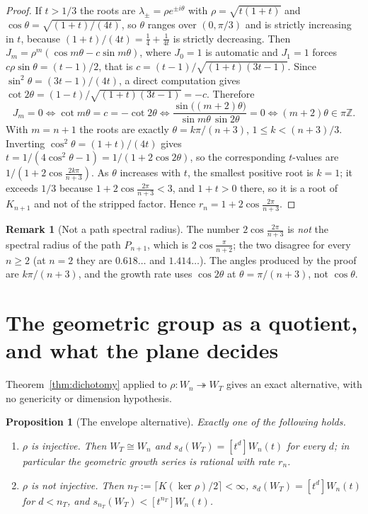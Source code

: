 \documentclass[11pt]{article}
\newcommand{\Z}{\mathbb{Z}}
\newtheorem{proposition}[theorem]{Proposition}
\theoremstyle{definition}
\newtheorem{remark}[theorem]{Remark}
\begin{document}
\begin{proof}
If $t>1/3$ the roots are $\lambda_\pm=\rho e^{\pm i\theta}$ with $\rho=\sqrt{t(1+t)}$ and
$\cos\theta=\sqrt{(1+t)/(4t)}$, so $\theta$ ranges over $(0,\pi/3)$ and is strictly increasing in $t$,
because $(1+t)/(4t)=\tfrac14+\tfrac1{4t}$ is strictly decreasing. Then
$J_m=\rho^m(\cos m\theta-c\sin m\theta)$, where $J_0=1$ is automatic and $J_1=1$ forces
$c\rho\sin\theta=(t-1)/2$, that is $c=(t-1)/\sqrt{(1+t)(3t-1)}$. Since
$\sin^2\theta=(3t-1)/(4t)$, a direct computation gives
$\cot2\theta=(1-t)/\sqrt{(1+t)(3t-1)}=-c$. Therefore
\[
   J_m=0\iff \cot m\theta=c=-\cot2\theta\iff\frac{\sin\bigl((m+2)\theta\bigr)}{\sin m\theta\,\sin2\theta}=0
   \iff (m+2)\theta\in\pi\Z .
\]
With $m=n+1$ the roots are exactly $\theta=k\pi/(n+3)$, $1\le k<(n+3)/3$. Inverting
$\cos^2\theta=(1+t)/(4t)$ gives $t=1/(4\cos^2\theta-1)=1/(1+2\cos2\theta)$, so the corresponding
$t$-values are $1/(1+2\cos\frac{2k\pi}{n+3})$. As $\theta$ increases with $t$, the smallest positive root
is $k=1$; it exceeds $1/3$ because $1+2\cos\frac{2\pi}{n+3}<3$, and $1+t>0$ there, so it is a root of
$K_{n+1}$ and not of the stripped factor. Hence $r_n=1+2\cos\frac{2\pi}{n+3}$.
\end{proof}

\begin{remark}[Not a path spectral radius]
\label{rem:notpath}
The number $2\cos\frac{2\pi}{n+3}$ is \emph{not} the spectral radius of the path $P_{n+1}$, which is
$2\cos\frac{\pi}{n+2}$; the two disagree for every $n\ge2$ (at $n=2$ they are $0.618\ldots$ and
$1.414\ldots$). The angles produced by the proof are $k\pi/(n+3)$, and the growth rate uses $\cos2\theta$
at $\theta=\pi/(n+3)$, not $\cos\theta$.
\end{remark}

\section{The geometric group as a quotient, and what the plane decides}

Theorem~\ref{thm:dichotomy} applied to $\rho\colon W_n\twoheadrightarrow W_T$ gives an exact alternative,
with no genericity or dimension hypothesis.

\begin{proposition}[The envelope alternative]
\label{prop:alternative}
Exactly one of the following holds.
\begin{enumerate}
\item[(i)] $\rho$ is injective. Then $W_T\cong W_n$ and $s_d(W_T)=[t^d]W_n(t)$ for every $d$; in
particular the geometric growth series is rational with rate $r_n$.
\item[(ii)] $\rho$ is not injective. Then $n_T:=\lceil K(\ker\rho)/2\rceil<\infty$,
$s_d(W_T)=[t^d]W_n(t)$ for $d<n_T$, and $s_{n_T}(W_T)<[t^{n_T}]W_n(t)$.
\end{enumerate}
\end{proposition}
\end{document}
